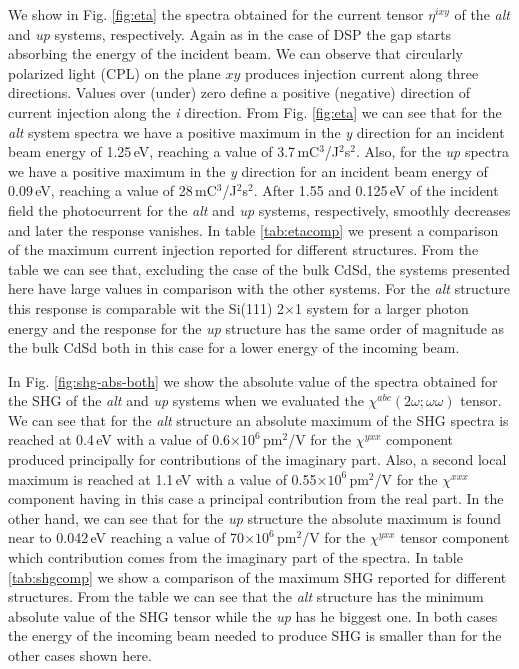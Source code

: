\documentclass[pss]{wiley2sp} %
\begin{document}
We show in Fig. \ref{fig:eta}
the spectra obtained for the current tensor {$\eta^{ixy}$} of the
\emph{alt} and \emph{up} systems, respectively. Again as in the case of DSP the gap starts absorbing the energy of the incident beam. We can observe that
circularly polarized light (CPL) on the plane $xy$ produces injection current
along three directions. Values over (under) zero define a positive (negative)
direction of current injection along the \emph{i} direction. From Fig.
\ref{fig:eta} we can see that for the \emph{alt} system spectra 
we have a positive maximum in the \emph{y} direction for an
incident beam energy of 1.25\,eV, reaching a value of
3.7\,mC$^{3}$/J$^{2}$s$^{2}$. Also, for the \emph{up} spectra 
we have a positive maximum in the \emph{y} direction for an
incident beam energy of 0.09\,eV, reaching a value of
28\,mC$^{3}$/J$^{2}$s$^{2}$. After 1.55 and 0.125\,eV of the incident field the photocurrent for the \emph{alt} and \emph{up} systems, respectively, smoothly decreases and later the response vanishes. In table \ref{tab:etacomp} we present a comparison
of the maximum current injection reported for different structures.
From the table we can see that, excluding the case of the bulk CdSd, the systems presented here have large values in comparison with the other systems. For the \emph{alt} structure this response is comparable wit the Si(111) 2$\times$1 system for a larger photon energy and the response for the \emph{up} structure has the same order of magnitude as the bulk CdSd both in this case for a lower energy of the incoming beam.

In Fig. \ref{fig:shg-abs-both}  we show the absolute value of the  spectra obtained
for the SHG of the \emph{alt} and \emph{up} systems when we evaluated the $
\chi^{abc}(2\omega;\omega\omega)$ tensor. We can see
that for the \emph{alt} structure an absolute
maximum of the SHG spectra is reached at 0.4\,eV with a value of
0.6$\times10^{6} $\,pm$^{2}$/V for the $\chi^{yxx} $ component produced
principally for contributions of the imaginary part. Also, a second local
maximum is reached at 1.1\,eV with a value of 0.55$\times10^{6} $\,pm$^{2}$/V
for the $\chi^{xxx} $ component having in this case a principal contribution
from the real part. In the other hand, we can see that for the
\emph{up} structure the absolute maximum is found near to 0.042\,eV reaching a
value of 70$\times10^{6} $\,pm$^{2}$/V for the $\chi^{yxx} $ tensor component
which contribution comes from the imaginary part of the spectra. In table
\ref{tab:shgcomp} we show a comparison of the maximum SHG reported for
different structures. From the table we can see that the \emph{alt} structure has the minimum absolute value of the SHG tensor while the \emph{up} has he biggest one. In both cases the energy of the incoming beam needed to produce SHG is smaller than for the other cases shown here.  
\end{document}
